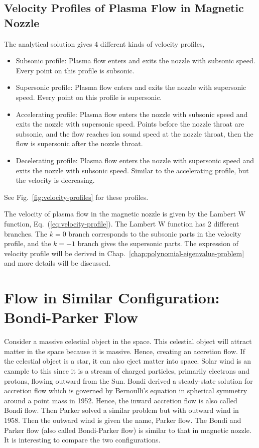 \subsection{Velocity Profiles of Plasma Flow in Magnetic Nozzle}
The analytical solution gives 4 different kinds of velocity profiles,
\begin{itemize}
	\item Subsonic profile: Plasma flow enters and exits the nozzle with subsonic speed. Every point on this profile is subsonic.
	\item Supersonic profile: Plasma flow enters and exits the nozzle with supersonic speed. Every point on this profile is supersonic.
	\item Accelerating profile: Plasma flow enters the nozzle with subsonic speed and exits the nozzle with supersonic speed. Points before the nozzle throat are subsonic, and the flow reaches ion sound speed at the nozzle throat, then the flow is supersonic after the nozzle throat.
	\item Decelerating profile: Plasma flow enters the nozzle with supersonic speed and exits the nozzle with subsonic speed. Similar to the accelerating profile, but the velocity is decreasing.
\end{itemize}
See Fig.~\ref{fig:velocity-profiles} for these profiles.

The velocity of plasma flow in the magnetic nozzle is given by the Lambert W function, Eq.~(\ref{eq:velocity-profile}). The Lambert W function has 2 different branches. The $k=0$ branch corresponds to the subsonic parts in the velocity profile, and the $k=-1$ branch gives the supersonic parts. The expression of velocity profile will be derived in Chap.~\ref{chap:polynomial-eigenvalue-problem} and more details will be discussed.

\section{Flow in Similar Configuration: Bondi-Parker Flow}
Consider a massive celestial object in the space. This celestial object will attract matter in the space because it is massive. Hence, creating an accretion flow. If the celestial object is a star, it can also eject matter into space. Solar wind is an example to this since it is a stream of charged particles, primarily electrons and protons, flowing outward from the Sun. Bondi derived a steady-state solution for accretion flow which is governed by Bernoulli's equation in spherical symmetry around a point mass in 1952. Hence, the inward accretion flow is also called Bondi flow. Then Parker solved a similar problem but with outward wind in 1958. Then the outward wind is given the name, Parker flow. \cite{aikawa_stability_1979,bondi_spherically_1952,keto_stability_2020} The Bondi and Parker flow (also called Bondi-Parker flow) is similar to that in magnetic nozzle. It is interesting to compare the two configurations.

